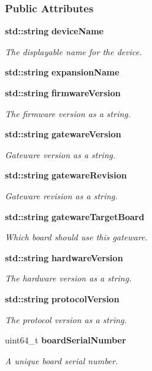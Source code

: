 \subsubsection*{Public Attributes}
\begin{DoxyCompactItemize}
\item 
{\bf std\+::string} {\bf device\+Name}
\begin{DoxyCompactList}\small\item\em The displayable name for the device. \end{DoxyCompactList}\item 
{\bf std\+::string} {\bf expansion\+Name}
\item 
{\bf std\+::string} {\bf firmware\+Version}
\begin{DoxyCompactList}\small\item\em The firmware version as a string. \end{DoxyCompactList}\item 
{\bf std\+::string} {\bf gateware\+Version}
\begin{DoxyCompactList}\small\item\em Gateware version as a string. \end{DoxyCompactList}\item 
{\bf std\+::string} {\bf gateware\+Revision}
\begin{DoxyCompactList}\small\item\em Gateware revision as a string. \end{DoxyCompactList}\item 
{\bf std\+::string} {\bf gateware\+Target\+Board}
\begin{DoxyCompactList}\small\item\em Which board should use this gateware. \end{DoxyCompactList}\item 
{\bf std\+::string} {\bf hardware\+Version}
\begin{DoxyCompactList}\small\item\em The hardware version as a string. \end{DoxyCompactList}\item 
{\bf std\+::string} {\bf protocol\+Version}
\begin{DoxyCompactList}\small\item\em The protocol version as a string. \end{DoxyCompactList}\item 
uint64\+\_\+t {\bf board\+Serial\+Number}
\begin{DoxyCompactList}\small\item\em A unique board serial number. \end{DoxyCompactList}\end{DoxyCompactItemize}


